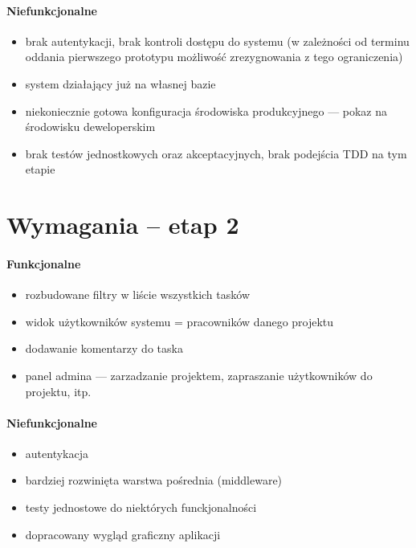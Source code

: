 \documentclass[a4paper,12pt,notitlepage]{mwrep}
\begin{document}
\paragraph{Niefunkcjonalne}
\begin{itemize}
	\item	brak autentykacji, brak kontroli dostępu do systemu (w zależności od terminu
			oddania pierwszego prototypu możliwość zrezygnowania z tego ograniczenia)
	\item	system działający już na własnej bazie
	\item	niekoniecznie gotowa konfiguracja środowiska produkcyjnego --- pokaz na środowisku deweloperskim
	\item	brak testów jednostkowych oraz akceptacyjnych, brak podejścia TDD na tym etapie
\end{itemize}




\section{Wymagania -- etap 2}
\paragraph{Funkcjonalne}
\begin{itemize}
	\item	rozbudowane filtry w liście wszystkich tasków
	\item	widok użytkowników systemu = pracowników danego projektu
	\item	dodawanie komentarzy do taska
	\item	panel admina --- zarzadzanie projektem, zapraszanie użytkowników do projektu, itp.
\end{itemize}
\paragraph{Niefunkcjonalne}
\begin{itemize}
	\item	autentykacja
	\item	bardziej rozwinięta warstwa pośrednia (middleware)
	\item	testy jednostowe do niektórych funckjonalności
	\item	dopracowany wygląd graficzny aplikacji
\end{itemize}
\end{document}

